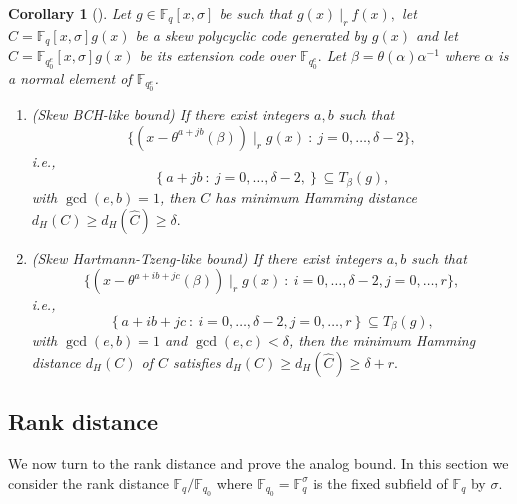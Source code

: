 \documentclass[12pt,paper]{article}
\theoremstyle{plain}
\newtheorem{corollary}[theorem]{Corollary}
\newcommand{\Fq}{\mathbb{F}_{q}}
\begin{document}
\begin{corollary}[\cite{Alfarano2021, Lobillo2017, Cathryn2024, Lobillo2025}]\label{CorBch}
Let $g \in \Fq[x,\sigma]$ be such that $ g(x) ~|_r~ f(x),$ let $ C= \Fq[x,\sigma] g(x)$ be a skew polycyclic code generated by $g(x)$ and let $\widehat{C}= \mathbb{F}_{q_0^e}[x,\sigma] g(x) $ be its extension code over $ \mathbb{F}_{q_0^e}.$ Let $\beta= \theta(\alpha)\alpha^{-1}$ where $\alpha$ is a normal element of $ \mathbb{F}_{q_0^e}$. 
\begin{enumerate}
    \item (Skew BCH-like bound) If there exist integers $a,b$ such that  
    $$ \{(x-\theta^{a+jb}(\beta)) \mid_r g(x) ~:~ j=0,\ldots, \delta-2\},$$ 
 i.e., $$ \left\{ a+jb   ~:~ j=0,\ldots,{\delta-2},  \right\} \subseteq T_{\beta}(g), $$
 with  $\gcd(e, b)=1$,  then $C$ has  minimum Hamming distance  $ d_H(C)\geq   d_H(\widehat{C}) \geq {\delta}.$
 
 \item  (Skew Hartmann-Tzeng-like bound)      If there exist integers $a,b$ such that 
 $$ \{ (x-{\theta^{a+ib+jc}(\beta)}) \mid_r g(x)  ~:~ i=0,\ldots,{\delta-2}, j=0,\ldots, {r}\},$$ 
  i.e., $$ \left\{ a+ib+jc  ~:~ i=0,\ldots,{\delta-2}, j=0,\ldots, {r} \right\} \subseteq T_{\beta}(g), $$
	with   $\gcd(e, b)=1 $ and $\gcd(e, c)<\delta$, then  the minimum Hamming distance $d_H(C)$ of  $C$ satisfies   $d_H(C)\geq   d_H(\widehat{C})  \geq {\delta}+ {r}. $ 
\end{enumerate}
\end{corollary}




\subsection{Rank distance}

We now turn to the rank distance and prove the analog bound. In this section  we consider the rank distance $ \Fq/ \mathbb{F}_{q_0}$ where $ \mathbb{F}_{q_0} =\Fq^{\sigma}$ is the fixed subfield of $ \Fq$ by $\sigma$.
\end{document}

